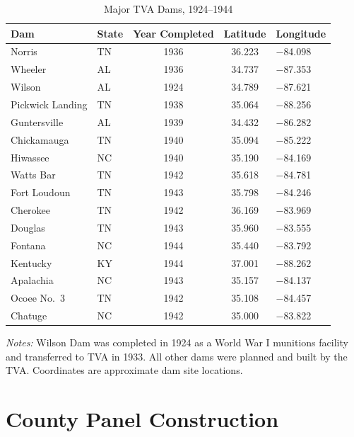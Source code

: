 \documentclass[12pt]{article}
\begin{document}
\begin{table}[htbp]
\centering
\caption{Major TVA Dams, 1924--1944}
\label{tab:dams}
\footnotesize
\begin{tabular}{llccl}
\toprule
Dam & State & Year Completed & Latitude & Longitude \\
\midrule
Norris & TN & 1936 & 36.223 & $-$84.098 \\
Wheeler & AL & 1936 & 34.737 & $-$87.353 \\
Wilson & AL & 1924 & 34.789 & $-$87.621 \\
Pickwick Landing & TN & 1938 & 35.064 & $-$88.256 \\
Guntersville & AL & 1939 & 34.432 & $-$86.282 \\
Chickamauga & TN & 1940 & 35.094 & $-$85.222 \\
Hiwassee & NC & 1940 & 35.190 & $-$84.169 \\
Watts Bar & TN & 1942 & 35.618 & $-$84.781 \\
Fort Loudoun & TN & 1943 & 35.798 & $-$84.246 \\
Cherokee & TN & 1942 & 36.169 & $-$83.969 \\
Douglas & TN & 1943 & 35.960 & $-$83.555 \\
Fontana & NC & 1944 & 35.440 & $-$83.792 \\
Kentucky & KY & 1944 & 37.001 & $-$88.262 \\
Apalachia & NC & 1943 & 35.157 & $-$84.137 \\
Ocoee No.\ 3 & TN & 1942 & 35.108 & $-$84.457 \\
Chatuge & NC & 1942 & 35.000 & $-$83.822 \\
\bottomrule
\end{tabular}
\begin{minipage}{0.95\textwidth}
\vspace{0.5em}
\footnotesize
\textit{Notes:} Wilson Dam was completed in 1924 as a World War I munitions facility and transferred to TVA in 1933. All other dams were planned and built by the TVA. Coordinates are approximate dam site locations.
\end{minipage}
\end{table}


\section{County Panel Construction}\label{app:linkage}
\end{document}
